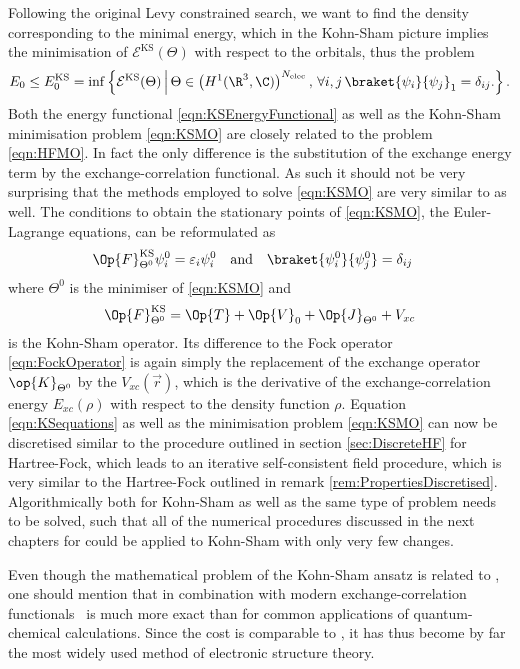 Following the original Levy constrained search,
we want to find the density corresponding to the minimal energy,
which in the Kohn-Sham picture implies the minimisation
of $\mathcal{E}^\text{KS}(\Theta)$ with respect to the orbitals,
thus the problem
\begin{equation}
	E_0 \leq E_0^\text{KS}
	= \inf \left\{
		\mathcal{E}^\text{KS}(\Theta)
		\, \middle| \,
		\Theta \in \left(H^1(\R^3, \C)\right)^{\Nelec}, \,
		\forall i,j \,
		\braket{\psi_i}{\psi_j}_1 = \delta_{ij}.
	\right\}.
	\label{eqn:KSMO}
\end{equation}
Both the energy functional \eqref{eqn:KSEnergyFunctional}
as well as the Kohn-Sham minimisation problem \eqref{eqn:KSMO} are closely
related to the \HF problem \eqref{eqn:HFMO}.
In fact the only difference is the substitution of the exchange energy term
by the exchange-correlation functional.
As such it should not be very surprising that the methods employed to solve
\eqref{eqn:KSMO} are very similar to \HF as well.
The conditions to obtain the stationary points of \eqref{eqn:KSMO},
the Euler-Lagrange equations,
can be reformulated as
\begin{align}
	\label{eqn:KSequations}
	\Op{F}^\text{KS}_{\Theta^0} \psi_i^0 &= \varepsilon_i \psi_i^0
	&&\text{and}&
	\braket{\psi_i^0}{\psi_j^0} &= \delta_{ij}
\end{align}
where $\Theta^0$ is the minimiser of \eqref{eqn:KSMO} and
\begin{equation}
	\Op{F}_{\Theta^0}^\text{KS} = \Op{T} + \Op{V}_0 + \Op{J}_{\Theta^0} + V_{xc}
	\label{eqn:KohnShamOperator}
\end{equation}
is the Kohn-Sham operator.
Its difference to the Fock operator \eqref{eqn:FockOperator}
is again simply the replacement of the exchange operator $\op{K}_{\Theta^0}$
by the  $V_{xc}(\vec{r})$,
which is the derivative of the exchange-correlation energy $E_{xc}(\rho)$
with respect to the density function $\rho$.
Equation \eqref{eqn:KSequations} as well as the minimisation problem
\eqref{eqn:KSMO} can now be discretised
similar to the procedure outlined in section \vref{sec:DiscreteHF}
for Hartree-Fock,
which leads to an iterative self-consistent field procedure,
which is very similar to the Hartree-Fock \SCF outlined in
remark \vref{rem:PropertiesDiscretised}.
Algorithmically both for Kohn-Sham \DFT as well as \HF the same type of problem
needs to be solved, such that all of the numerical procedures
discussed in the next chapters for \HF could be applied to Kohn-Sham \DFT
with only very few changes.

Even though the mathematical problem of the Kohn-Sham \DFT ansatz is related
to \HF, one should mention that \DFT in combination with modern
exchange-correlation functionals~%
\cite{Tsuneda2014,Grimme2011,Perdew2005,Perdew1996,Becke1993,Lee1988}
is much more exact than \HF
for common applications of quantum-chemical calculations.
Since the cost is comparable to \HF,
it has thus become by far the most widely used method of
electronic structure theory.
